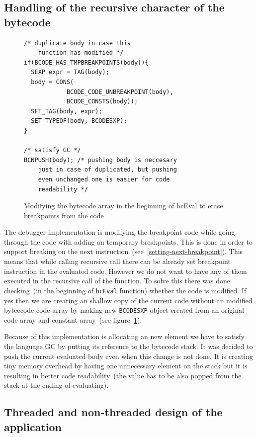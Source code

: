 \documentclass[thesis=M,english]{FITthesis}[2018/10/20]
\newcommand{\code}[1]{\texttt{#1}}
\begin{document}
{\subsection{Handling of the recursive character of the bytecode}

\begin{figure}[h]
\begin{lstlisting}
/* duplicate body in case this 
	function has modified */
if(BCODE_HAS_TMPBREAKPOINTS(body)){
  SEXP expr = TAG(body);
  body = CONS(
            BCODE_CODE_UNBREAKPOINT(body), 
            BCODE_CONSTS(body));
  SET_TAG(body, expr);
  SET_TYPEOF(body, BCODESXP);
}

/* satisfy GC */
BCNPUSH(body); /* pushing body is neccesary 
	just in case of duplicated, but pushing 
	even unchanged one is easier for code
    readability */

\end{lstlisting}
	\caption{Modifying the bytecode array in the beginning of bcEval to erase breakpoints from the code}\label{fig:erase-breakpoints-in-bceval}
\end{figure}

The debugger implementation is modifying the breakpoint code while going through the code with adding an temporary breakpoints. This is done in order to support breaking on the next instruction~(see~\ref{setting-next-breakpoint}). This means that while calling recursive call there can be already set breakpoint instruction in the evaluated code. However we do not want to have any of them executed in the recursive call of the function. To solve this there was done checking~(in the beginning of \code{bcEval} function) whether the code is modified. If yes then we are creating an shallow copy of the current code without an modified byteecode code array by making new \code{BCODESXP} object created from an original code array and constant array~(see figure~\ref{fig:erase-breakpoints-in-bceval}).

Because of this implementation is allocating an new element we have to satisfy the language GC by putting its reference to the bytecode stack. It was decided to push the current evaluated body even when this change is not done. It is creating tiny memory overhead by having one unnecessary element on the stack but it is resulting in better code readability~(the value has to be also popped from the stack at the ending of evaluating).


\subsection{Threaded and non-threaded design of the application}\label{threaded-and-non-threaded-design}

}
\end{document}

